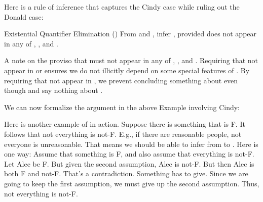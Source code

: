 Here is a rule of inference that captures the Cindy case while ruling out the 
Donald case:

\begin{infrule}

 \item[Existential Quantifier Elimination (\exE)] From  and , infer , provided \p{\kappa} does not 
  appear in any of , , and \p{\psi}.

 \end{infrule}

A note on the  proviso that \p{\kappa} must not appear in any of   , 
, and \p{\psi}. Requiring that \p{\kappa} not appear in  or 
 ensures we do not illicitly depend on some special features of 
\p{\kappa}.  By requiring that \p{\kappa} not appear in \p{\psi}, we prevent 
concluding something about \p{\kappa} even though  and  say 
nothing about \p{\kappa}.


We can now formalize the argument in the above Example involving Cindy:



\begin{argumentN}[1]








\end{argumentN}



Here is another example of \exE{} in action. Suppose there is something that is 
F. It follows that not everything is not-F. E.g., if there are reasonable people, 
not everyone is unreasonable. That means we should be able to infer from 
 to .  
Here is one way: Assume that something is F, and also assume that everything is 
not-F. Let Alec be F. But given the second assumption, Alec is not-F. But then 
Alec is both F and not-F. That's a contradiction. Something has to give. Since 
we are going to keep the first assumption, we must give up the second 
assumption.  Thus, not everything is not-F. 

